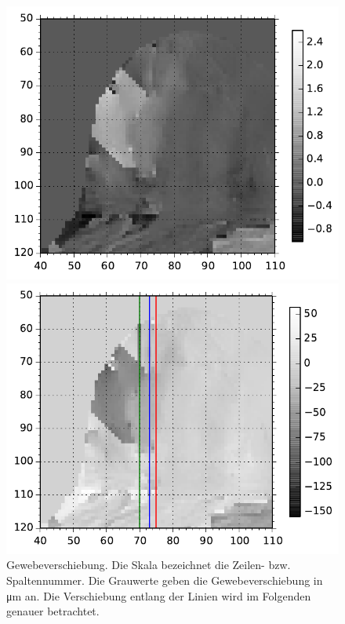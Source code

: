 \documentclass[
    11pt,
    ngerman
]{scrbook}
\begin{document}
\begin{figure}[htbp]
    \begin{minipage}[htbp]{.48\textwidth}
        \centering
        \includegraphics[width=.9\textwidth]{Abbildungen/diff_standart_mask.pdf}
        \caption{%
            Um Phasensprünge bereinigtes Phasenbild. Die Phasenverschiebung ohne US wurde abgezogen. Die Skala bezeichnet die Zeilen- bzw. Spaltennummer. Die Grauwerte geben die Phasenverschiebung in Vielfachen von $2\piup$ an. 
        }
        \label{fig:prob1_unwrapped}
    \end{minipage}
    \hfill
    \begin{minipage}[htbp]{.48\textwidth}
        \centering
        \includegraphics[width=.9\textwidth]{Abbildungen/dis_standart_lines.pdf}
        \caption{%
            Gewebeverschiebung. Die Skala bezeichnet die Zeilen- bzw. Spaltennummer. Die Grauwerte geben die Gewebeverschiebung in \si{\micro\meter} an. Die Verschiebung entlang der Linien wird im Folgenden genauer betrachtet.
        }
        \label{fig:prob1_displacement}
    \end{minipage}
\end{figure}
\end{document}
